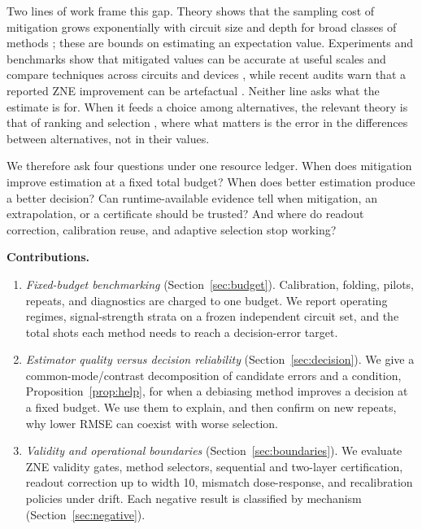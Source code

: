 \documentclass[10pt,twocolumn]{article}
\newcommand{\paragraphlead}[1]{\textbf{#1}\quad}
\begin{document}
Two lines of work frame this gap. Theory shows that the sampling cost of mitigation grows
exponentially with circuit size and depth for broad classes of methods
\cite{takagi2022,takagi2023,quek2024}; these are bounds on estimating an expectation value.
Experiments and benchmarks show that mitigated values can be accurate at useful scales
\cite{kandala2019,kim2023,vandenberg2023} and compare techniques across circuits and devices
\cite{bultrini2021,cirstoiu2023,larose2022}, while recent audits warn that a reported ZNE improvement can
be artefactual \cite{koster2026}. Neither line asks what the estimate is for. When it feeds a choice
among alternatives, the relevant theory is that of ranking and selection
\cite{bechhofer1954}, where what matters is the error in the differences between alternatives, not in
their values.

We therefore ask four questions under one resource ledger. When does mitigation improve
estimation at a fixed total budget? When does better estimation produce a better decision? Can
runtime-available evidence tell when mitigation, an extrapolation, or a certificate should be
trusted? And where do readout correction, calibration reuse, and adaptive selection stop working?

\paragraphlead{Contributions.}
\begin{enumerate}
\item \emph{Fixed-budget benchmarking} (Section~\ref{sec:budget}). Calibration, folding, pilots,
repeats, and diagnostics are charged to one budget. We report operating regimes, signal-strength
strata on a frozen independent circuit set, and the total shots each method needs to reach a
decision-error target.
\item \emph{Estimator quality versus decision reliability} (Section~\ref{sec:decision}). We give a
common-mode/contrast decomposition of candidate errors and a condition, Proposition~\ref{prop:help},
for when a debiasing method improves a decision at a fixed budget. We use them to explain, and then
confirm on new repeats, why lower RMSE can coexist with worse selection.
\item \emph{Validity and operational boundaries} (Section~\ref{sec:boundaries}). We evaluate ZNE
validity gates, method selectors, sequential and two-layer certification, readout correction up
to width 10, mismatch dose-response, and recalibration policies under drift. Each negative result is
classified by mechanism (Section~\ref{sec:negative}).
\end{enumerate}
\end{document}
